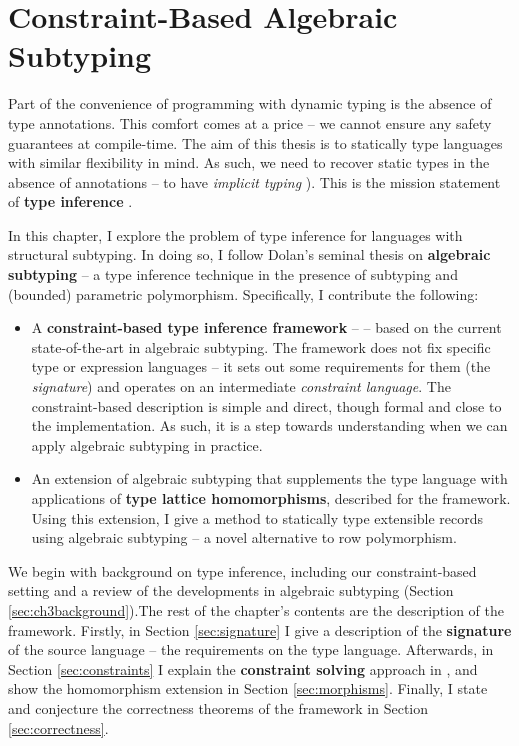 \newcommand{\mlsub}{\textsc{MLsub}}
\newcommand{\simplesub}{\textsc{Simple-sub}}
\newcommand{\mlstruct}{\textsc{MLstruct}}
\newenvironment{example}{%
\begin{tcolorbox}[%
    colback=blue!5!white,%
    colframe=blue!60!black,%
    title=\textsc{Example}%
]%
}{%
\end{tcolorbox}%
}

\chapter{Constraint-Based Algebraic Subtyping}
\label{algebraic-subtyping}

Part of the convenience of programming with dynamic typing is the absence of type annotations. 
This comfort comes at a price -- we cannot ensure any safety guarantees at compile-time. 
The aim of this thesis is to statically type languages with similar flexibility in mind. As such, we need to recover static types in the absence of annotations -- to have \emph{implicit typing} \cite{remy-record-inference}). This is the mission statement of \textbf{type inference} \cite{tapl}.

In this chapter, I explore the problem of type inference for languages with structural subtyping. In doing so, I follow Dolan's seminal thesis on \textbf{algebraic subtyping} -- a type inference technique in the presence of subtyping and (bounded) parametric polymorphism. Specifically, I contribute the following:
\begin{itemize}
    \item A \textbf{constraint-based type inference framework} -- \inference{} -- based on the current state-of-the-art in algebraic subtyping. The framework does not fix specific type or expression languages -- it sets out some requirements for them (the \textit{signature}) and operates on an intermediate \emph{constraint language}. The constraint-based description is simple and direct, though formal and close to the implementation. As such, it is a step towards understanding when we can apply algebraic subtyping in practice.
    \item An extension of algebraic subtyping that supplements the type language with applications of \textbf{type lattice homomorphisms}, described for the framework. Using this extension, I give a method to statically type extensible records using algebraic subtyping -- a novel alternative to row polymorphism. 
\end{itemize}

We begin with background on type inference, including our constraint-based setting and a review of the developments in algebraic subtyping (Section \ref{sec:ch3background}).The rest of the chapter's contents are the description of the framework. Firstly, in Section \ref{sec:signature} I give a description of the \textbf{signature} of the source language -- the requirements on the type language. Afterwards, in Section \ref{sec:constraints} I explain the \textbf{constraint solving} approach in \inference{}, and show the homomorphism extension in Section \ref{sec:morphisms}. Finally, I state and conjecture the correctness theorems of the framework in Section \ref{sec:correctness}. 

